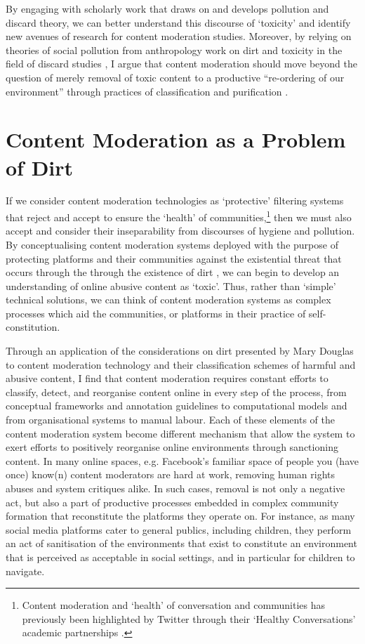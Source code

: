 By engaging with scholarly work that draws on and develops pollution and discard theory, we can better understand this discourse of `toxicity' and identify new avenues of research for content moderation studies.
Moreover, by relying on theories of social pollution from anthropology \cite{Douglas:1966}  work on dirt and toxicity in the field of discard studies \cite{Liboiron:2018,Lepawsky:2019}, I argue that content moderation should move beyond the question of merely removal of toxic content to a productive ``re-ordering of our environment'' through practices of classification and purification \cite{Douglas:1966}.

\section{Content Moderation as a Problem of Dirt}
If we consider content moderation technologies as `protective' filtering systems that reject and accept to ensure the `health' of communities,\footnote{Content moderation and `health' of conversation and communities has previously been highlighted by Twitter through their `Healthy Conversations' academic partnerships \citep{Twitter:Health:2018}.} then we must also accept and consider their inseparability from discourses of hygiene and pollution.
By conceptualising content moderation systems deployed with the purpose of protecting platforms and their communities against the existential threat that occurs through the through the existence of dirt \cite{Lepawsky:2019}, we can begin to develop an understanding of online abusive content as `toxic'. 
Thus, rather than `simple' technical solutions, we can think of content moderation systems as complex processes which aid the communities, or platforms in their practice of self-constitution.

Through an application of the considerations on dirt presented by Mary Douglas \citeyear{Douglas:1966} to content moderation technology and their classification schemes of harmful and abusive content, I find that content moderation requires constant efforts to classify, detect, and reorganise content online in every step of the process, from conceptual frameworks and annotation guidelines to computational models and from organisational systems to manual labour. 
Each of these elements of the content moderation system become different mechanism that allow the system to exert efforts to positively reorganise online environments through sanctioning content. 
In many online spaces, e.g. Facebook's familiar space of people you (have once) know(n) content moderators are hard at work, removing human rights abuses and system critiques alike.
In such cases, removal is not only a negative act, but also a part of productive processes embedded in complex community formation that reconstitute the platforms they operate on.
For instance, as many social media platforms cater to general publics, including children, they perform an act of sanitisation of the environments that exist to constitute an environment that is perceived as acceptable in social settings, and in particular for children to navigate.

